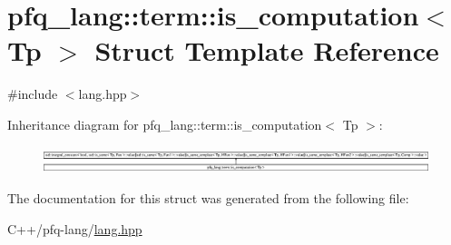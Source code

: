 \hypertarget{structpfq__lang_1_1term_1_1is__computation}{\section{pfq\-\_\-lang\-:\-:term\-:\-:is\-\_\-computation$<$ Tp $>$ Struct Template Reference}
\label{structpfq__lang_1_1term_1_1is__computation}
}


{\ttfamily \#include $<$lang.\-hpp$>$}

Inheritance diagram for pfq\-\_\-lang\-:\-:term\-:\-:is\-\_\-computation$<$ Tp $>$\-:\begin{figure}[H]
\begin{center}
\leavevmode
\includegraphics[height=0.775087cm]{structpfq__lang_1_1term_1_1is__computation}
\end{center}
\end{figure}


The documentation for this struct was generated from the following file\-:\begin{DoxyCompactItemize}
\item 
C++/pfq-\/lang/\hyperlink{lang_8hpp}{lang.\-hpp}\end{DoxyCompactItemize}
